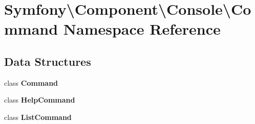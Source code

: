 \section{Symfony\textbackslash{}Component\textbackslash{}Console\textbackslash{}Command Namespace Reference}
\label{namespace_symfony_1_1_component_1_1_console_1_1_command}
\subsection*{Data Structures}
\begin{DoxyCompactItemize}
\item 
class {\bf Command}
\item 
class {\bf Help\+Command}
\item 
class {\bf List\+Command}
\end{DoxyCompactItemize}
